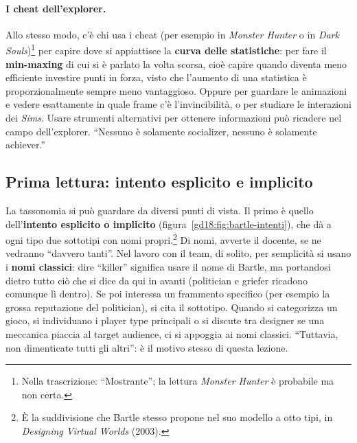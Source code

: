 \paragraph{I cheat dell'explorer.} Allo stesso modo, c'è chi usa i cheat (per
esempio in \emph{Monster Hunter} o in \emph{Dark Souls})\footnote{Nella trascrizione:
``Mostrante''; la lettura \emph{Monster Hunter} è probabile ma non certa.} per capire
dove si appiattisce la \textbf{curva delle statistiche}: per fare il
\textbf{min-maxing} di cui si è parlato la volta scorsa, cioè capire quando diventa
meno efficiente investire punti in forza, visto che l'aumento di una statistica è
proporzionalmente sempre meno vantaggioso. Oppure per guardare le animazioni e
vedere esattamente in quale frame c'è l'invincibilità, o per studiare le interazioni
dei \emph{Sims}. Usare strumenti alternativi per ottenere informazioni può ricadere
nel campo dell'explorer. ``Nessuno è solamente socializer, nessuno è solamente
achiever.''


\subsection{Prima lettura: intento esplicito e implicito}

La tassonomia si può guardare da diversi punti di vista. Il primo è quello
dell'\textbf{intento esplicito o implicito} (figura~\ref{gd18:fig:bartle-intenti}),
che dà a ogni tipo due sottotipi con nomi propri.\footnote{È la suddivisione che
Bartle stesso propone nel suo modello a otto tipi, in \emph{Designing Virtual Worlds}
(2003).} Di nomi, avverte il docente, se ne vedranno ``davvero tanti''. Nel lavoro
con il team, di solito, per semplicità si usano i \textbf{nomi classici}: dire
``killer'' significa usare il nome di Bartle, ma portandosi dietro tutto ciò che si
dice da qui in avanti (politician e griefer ricadono comunque lì dentro). Se poi
interessa un frammento specifico (per esempio la grossa reputazione del politician),
si cita il sottotipo. Quando si categorizza un gioco, si individuano i player type
principali o si discute tra designer se una meccanica piaccia al target audience, ci
si appoggia ai nomi classici. ``Tuttavia, non dimenticate tutti gli altri'': è il
motivo stesso di questa lezione.

